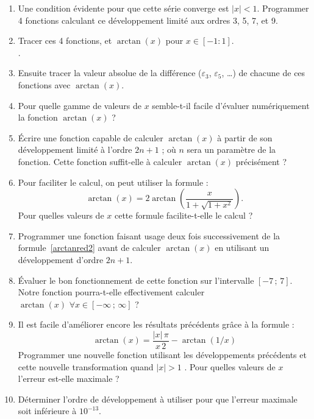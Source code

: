 \begin{enumerate}
\item  Une  condition  évidente  pour que  cette  série  converge  est
  $|x|<1$.  Programmer  4 fonctions calculant ce  développement limité
  aux ordres 3, 5, 7, et 9.
\item  Tracer   ces  4   fonctions,  et   $\arctan(x)$  pour   $x  \in
  [-1:1]$.\\ .
\item   Ensuite   tracer   la   valeur  absolue   de   la   différence
  ($\varepsilon_3$, $\varepsilon_5$, \dots) de chacune de ces fonctions
  avec $\arctan(x)$.
\item Pour quelle gamme de valeurs de $x$ semble-t-il facile d'évaluer
  numériquement la fonction $\arctan(x)$ ?
\item Écrire une fonction capable de calculer $\arctan(x)$ à partir de
  son développement limité à l'ordre  $2n+1$ ; où $n$ sera un paramètre de
  la fonction.   Cette fonction  suffit-elle à  calculer $\arctan(x)$
  précisément ?
\item Pour faciliter le calcul, on peut utiliser la formule :
  \begin{equation}\label{arctanred2}
    \arctan(x) = 2 \arctan\left(\frac{x}{1+\sqrt{1+x^2}}\right).
  \end{equation}
  Pour quelles valeurs de $x$ cette formule facilite-t-elle le calcul
  ?
\item Programmer  une fonction faisant usage  deux fois successivement
  de  la formule~\ref{arctanred2}  avant de  calculer $\arctan(x)$  en
  utilisant un développement d'ordre $2n+1$.
\item Évaluer le bon fonctionnement de cette fonction sur
  l'intervalle $[-7\,;\,7]$. Notre fonction pourra-t-elle effectivement
  calculer $\arctan(x) \,\, \forall x \in [-\infty\,;\,\infty]$ ?
\item Il est facile d'améliorer encore les résultats précédents
  grâce à la formule :
\begin{equation}
\arctan(x) = \frac{|x|\,\pi}{x\,2}-\arctan(1/x)
\end{equation}
Programmer une nouvelle fonction utilisant les développements précédents et
cette nouvelle transformation quand $|x|>1$ . Pour
quelles valeurs de $x$ l'erreur est-elle maximale ?
\item Déterminer l'ordre de développement à utiliser pour que
l'erreur maximale soit inférieure à $10^{-13}$.
\end{enumerate}

